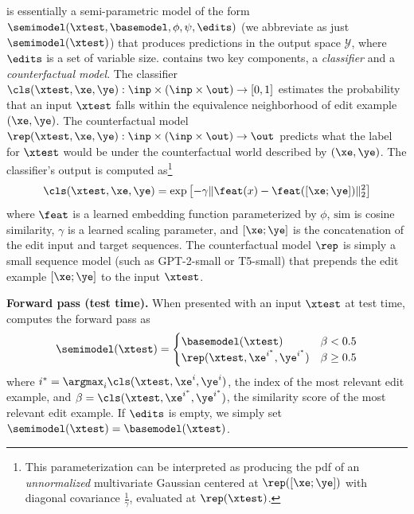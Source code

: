 \subsection{{\fullname}}

{\name} is essentially a semi-parametric model of the form $\semimodel(\xtest, \basemodel, \phi, \psi, \edits)$ (we abbreviate as just $\semimodel(\xtest)$) that produces predictions in the output space $\mathcal{Y}$, where $\edits$ is a set of variable size. {\name} contains two key components, a \textit{classifier} and a \textit{counterfactual model}. The classifier $\cls(\xtest, \xe, \ye) : \inp \times (\inp \times \out) \rightarrow [0, 1]$ estimates the probability that an input $\xtest$ falls within the equivalence neighborhood of edit example $(\xe, \ye)$. The counterfactual model $\rep(\xtest, \xe, \ye) : \inp \times (\inp \times \out) \rightarrow \out$ predicts what the label for $\xtest$ would be under the counterfactual world described by $(\xe, \ye)$. The classifier's output is computed as\footnote{This parameterization can be interpreted as producing the pdf of an \textit{unnormalized} multivariate Gaussian centered at $\rep([\xe;\ye])$ with diagonal covariance $\frac{1}{\gamma}$, evaluated at $\rep(\xtest)$.}
\begin{equation}
    \cls(\xtest, \xe, \ye) = \exp\left[-\gamma \|\feat(x) - \feat([\xe; \ye])\|^2_2\right]
\end{equation}
where $\feat$ is a learned embedding function parameterized by $\phi$, $\text{sim}$ is cosine similarity, $\gamma$ is a learned scaling parameter, and $[\xe; \ye]$ is the concatenation of the edit input and target sequences. The counterfactual model $\rep$ is simply a small sequence model (such as GPT-2-small or T5-small) that prepends the edit example $[\xe; \ye]$ to the input $\xtest$.

\textbf{Forward pass (test time).} When presented with an input $\xtest$ at test time, {\name} computes the forward pass as
\begin{equation}
    \semimodel(\xtest) = 
    \begin{cases}
        \basemodel(\xtest) & \beta < 0.5 \\
        \rep(\xtest, \xe^{i^*}, \ye^{i^*}) & \beta \ge 0.5
    \end{cases}
\end{equation}
where $i^* = \argmax_i \cls(\xtest, \xe^i, \ye^i)$, the index of the most relevant edit example, and $\beta = \cls(\xtest, \xe^{i^*}, \ye^{i^*})$, the similarity score of the most relevant edit example. If $\edits$ is empty, we simply set $\semimodel(\xtest) = \basemodel(\xtest)$.
